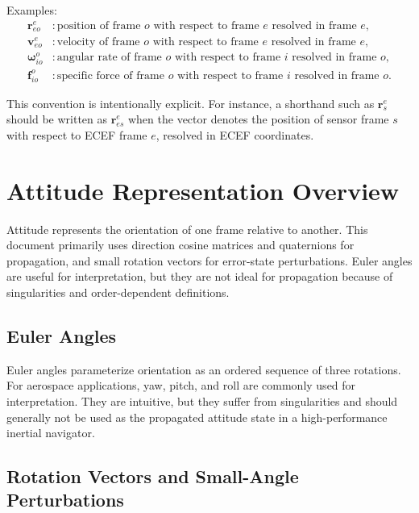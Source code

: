 \documentclass[11pt,oneside]{book}
\begin{document}
Examples:
\begin{align}
\mathbf{r}_{eo}^{e} &: \text{position of frame } o \text{ with respect to frame } e \text{ resolved in frame } e,\\
\mathbf{v}_{eo}^{e} &: \text{velocity of frame } o \text{ with respect to frame } e \text{ resolved in frame } e,\\
\boldsymbol{\omega}_{io}^{o} &: \text{angular rate of frame } o \text{ with respect to frame } i \text{ resolved in frame } o,\\
\mathbf{f}_{io}^{o} &: \text{specific force of frame } o \text{ with respect to frame } i \text{ resolved in frame } o.
\end{align}

This convention is intentionally explicit. For instance, a shorthand such as $\mathbf{r}_{s}^{e}$ should be written as $\mathbf{r}_{es}^{e}$ when the vector denotes the position of sensor frame $s$ with respect to ECEF frame $e$, resolved in ECEF coordinates.

\section{Attitude Representation Overview}

Attitude represents the orientation of one frame relative to another. This document primarily uses direction cosine matrices and quaternions for propagation, and small rotation vectors for error-state perturbations. Euler angles are useful for interpretation, but they are not ideal for propagation because of singularities and order-dependent definitions.

\subsection{Euler Angles}

Euler angles parameterize orientation as an ordered sequence of three rotations. For aerospace applications, yaw, pitch, and roll are commonly used for interpretation. They are intuitive, but they suffer from singularities and should generally not be used as the propagated attitude state in a high-performance inertial navigator.

\subsection{Rotation Vectors and Small-Angle Perturbations}
\end{document}
